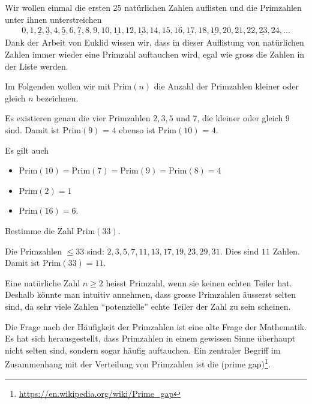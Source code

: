 Wir wollen einmal die ersten $25$ natürlichen Zahlen auflisten und die Primzahlen unter ihnen unterstreichen
\begin{align*}
	0, 1, \underline{2}, \underline{3}, 4, \underline{5}, 6, \underline{7}, 8, 9, 10, \underline{11}, 12, \underline{13}, 14, 15, 16, \underline{17}, 18, \underline{19}, 20, 21, 22, \underline{23}, 24, \ldots
\end{align*}
Dank der Arbeit von Euklid wissen wir, dass in dieser Auflistung von natürlichen Zahlen immer wieder eine Primzahl auftauchen wird, egal wie gross die Zahlen in der Liste werden.

\begin{mydefinition}[Prim]
Im Folgenden wollen wir mit $\text{Prim}(n)$ die Anzahl der Primzahlen kleiner oder gleich $n$ bezeichnen.
\end{mydefinition}

\begin{myexample}
Es existieren genau die vier Primzahlen $2, 3, 5$ und $7$, die kleiner oder gleich $9$ sind. Damit ist $\text{Prim}(9)$ = $4$ ebenso ist $\text{Prim}(10)$ = $4$.

Es gilt auch
\begin{itemize}
	\item
	      $\text{Prim}(10) = \text{Prim}(7) = \text{Prim}(9) = \text{Prim}(8) = 4$
	\item
	      $\text{Prim}(2) = 1$
	\item
	      $\text{Prim}(16) = 6$.
\end{itemize}
\end{myexample}

\begin{myexercise}
	Bestimme die Zahl $\text{Prim}(33)$.
	\begin{myanswer}
		Die Primzahlen $\leq 33$ sind:
		$2, 3, 5, 7, 11, 13, 17, 19, 23, 29, 31$.
		Dies sind $11$ Zahlen. Damit ist $\text{Prim}(33) = 11$.
	\end{myanswer}
\end{myexercise}

Eine natürliche Zahl $n\geq 2$ heisst Primzahl, wenn sie keinen echten Teiler hat.
Deshalb könnte man intuitiv annehmen, dass grosse Primzahlen äusserst selten sind, da sehr viele Zahlen \enquote{potenzielle} echte Teiler der Zahl zu sein scheinen.

Die Frage nach der Häufigkeit der Primzahlen ist eine alte Frage der Mathematik. Es hat sich herausgestellt, dass Primzahlen in einem gewissen Sinne überhaupt nicht selten sind, sondern sogar häufig auftauchen. Ein zentraler Begriff im Zusammenhang mit der Verteilung von Primzahlen ist die  (prime gap)\footnote{\url{https://en.wikipedia.org/wiki/Prime_gap}}.

